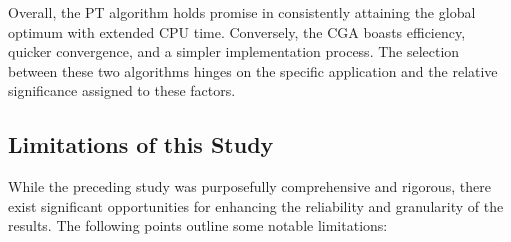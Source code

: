 \documentclass[10pt]{article}
\begin{document}
\begin{multicols}{2}
Overall, the PT algorithm holds promise in consistently attaining the global optimum with extended CPU time. Conversely, the CGA boasts efficiency, quicker convergence, and a simpler implementation process. The selection between these two algorithms hinges on the specific application and the relative significance assigned to these factors.

\subsection{Limitations of this Study}

While the preceding study was purposefully comprehensive and rigorous, there exist significant opportunities for enhancing the reliability and granularity of the results. The following points outline some notable limitations:


\end{multicols}
\end{document}
